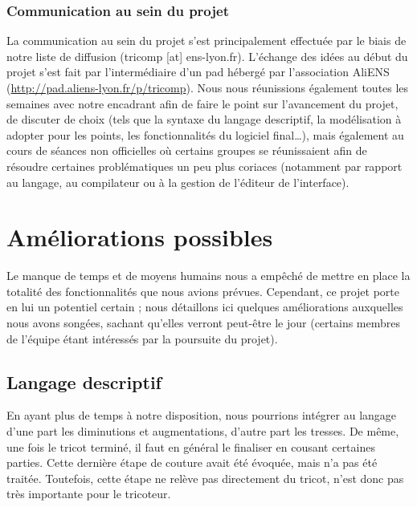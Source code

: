 \documentclass{article}
\begin{document}

\subsubsection{Communication au sein du projet}

La communication au sein du projet s'est principalement effectuée par le biais de notre liste
de diffusion (tricomp [at] ens-lyon.fr). L'échange des idées au début du projet s'est 
fait par l'intermédiaire d'un pad hébergé par l'association AliENS (\url{http://pad.aliens-lyon.fr/p/tricomp}). 
Nous nous réunissions également toutes les semaines avec notre encadrant afin de faire le point 
sur l'avancement du projet, de discuter de choix (tels que la syntaxe du langage descriptif, 
la modélisation à adopter pour les points, les fonctionnalités du logiciel final\dots), mais 
également au cours de séances non officielles où certains groupes se réunissaient 
afin de résoudre certaines problématiques un peu plus coriaces (notamment par rapport au langage, 
au compilateur ou à la gestion de l'éditeur de l'interface).

\section{Améliorations possibles}

Le manque de temps et de moyens humains nous a empêché de mettre en
place la totalité des fonctionnalités que nous avions prévues. Cependant, 
ce projet porte en lui un potentiel certain ; nous détaillons
ici quelques améliorations auxquelles nous avons songées, sachant qu'elles verront
peut-être le jour (certains membres de l'équipe étant intéressés par la 
poursuite du projet).

\subsection{Langage descriptif}

En ayant plus de temps à notre disposition, nous pourrions intégrer au
langage d'une part les diminutions et augmentations, d'autre part les
tresses. De même, une fois le tricot terminé, il faut en général le
finaliser en cousant certaines parties. Cette dernière étape de
couture avait été évoquée, mais n'a pas été traitée. Toutefois, 
cette étape ne relève pas directement du tricot, n'est donc pas très
importante pour le tricoteur.
\end{document}
